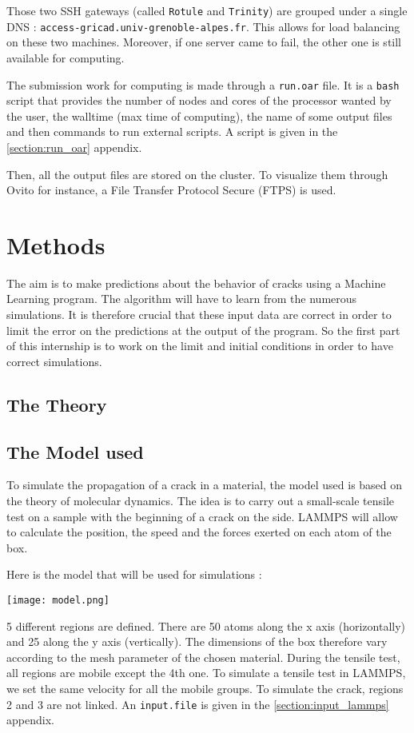         Those two SSH gateways (called \verb|Rotule| and \verb|Trinity|) are grouped under a single DNS : \verb|access-gricad.univ-grenoble-alpes.fr|. This allows for load balancing on these two machines. Moreover, if one server came to fail, the other one is still available for computing. 
        
        The submission work for computing is made through a \verb|run.oar| file. It is a \verb|bash| script that provides the number of nodes and cores of the processor wanted by the user, the walltime (max time of computing), the name of some output files and then commands to run external scripts. A script is given in the \ref{section:run_oar} appendix.

        Then, all the output files are stored on the cluster. To visualize them through Ovito for instance, a File Transfer Protocol Secure (FTPS) is used. 


\section{Methods}

    The aim is to make predictions about the behavior of cracks using a Machine Learning program. The algorithm will have to learn from the numerous simulations. It is therefore crucial that these input data are correct in order to limit the error on the predictions at the output of the program. So the first part of this internship is to work on the limit and initial conditions in order to have correct simulations.

    \subsection{The Theory}

    \subsection{The Model used}
        To simulate the propagation of a crack in a material, the model used is based on the theory of molecular dynamics. The idea is to carry out a small-scale tensile test on a sample with the beginning of a crack on the side. LAMMPS will allow to calculate the position, the speed and the forces exerted on each atom of the box. \medskip
        
        Here is the model that will be used for simulations : 

        \begin{center}
            \captionsetup{type = figure}
            \texttt{[image: model.png]}
        \end{center}

        5 different regions are defined. There are 50 atoms along the x axis (horizontally) and 25 along the y axis (vertically). The dimensions of the box therefore vary according to the mesh parameter of the chosen material. During the tensile test, all regions are mobile except the 4th one. To simulate a tensile test in LAMMPS, we set the same velocity for all the mobile groups. To simulate the crack, regions 2 and 3 are not linked. An \verb|input.file| is given in the \ref{section:input_lammps} appendix.